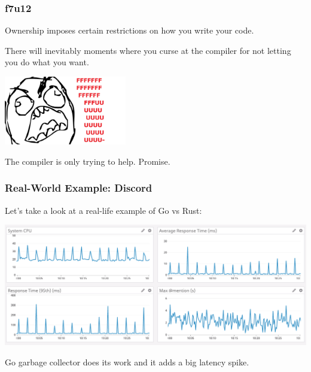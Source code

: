 \begin{frame}
\frametitle{f7u12}

Ownership imposes certain restrictions on how you write your code.

There will inevitably moments where you curse at the compiler for not letting you do what you want.

\begin{center}
	\includegraphics[width=0.4\textwidth]{images/Rage.jpg}
\end{center}

The compiler is only trying to help. Promise.

\end{frame}


\begin{frame}
\frametitle{Real-World Example: Discord}

Let's take a look at a real-life example of Go vs Rust:

\begin{center}
\includegraphics[width=\textwidth]{images/golang-gc.png}
\end{center}

Go garbage collector does its work and it adds a big latency spike.


\end{frame}


